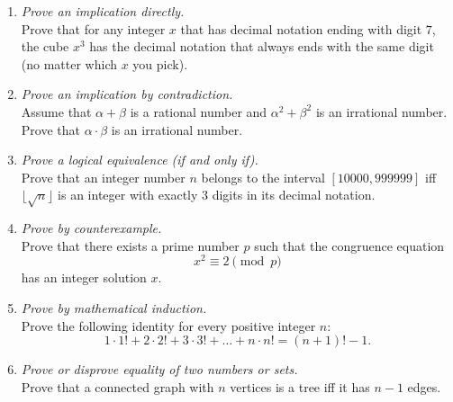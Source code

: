 \documentclass[a4paper,12pt]{article}
\begin{document}
\begin{enumerate}
\item {\small \em Prove an implication directly.}\\
Prove that for any integer $x$ that has decimal notation ending with digit $7$,
the cube $x^3$ has the decimal notation that always ends with the same digit
(no matter which $x$ you pick).


\item {\small \em Prove an implication by contradiction.}\\
Assume that $\alpha + \beta$ is a rational number and $\alpha^2 + \beta^2$ is
an irrational number. Prove that $\alpha \cdot \beta$ is an irrational number.


\item {\small \em  Prove a logical equivalence (if and only if).}\\
Prove that an integer number $n$ belongs to the interval $[10000,999999]$
iff $\lfloor \sqrt{n} \rfloor$ is an integer with exactly $3$ digits in
its decimal notation.


\item {\small \em Prove by counterexample.}\\
Prove that there exists a prime number $p$ such that the congruence equation
\[ x^2 \equiv 2 \pmod{p} \]
has an integer solution $x$.


\item {\small \em
Prove by mathematical induction.}\\
Prove the following identity for every positive integer $n$:
\[ 1 \cdot 1! + 2 \cdot 2! + 3 \cdot 3! + \ldots + n \cdot n! = (n+1)! - 1. \]




\item {\small \em Prove or disprove equality of two numbers or sets.}\\
Prove that a connected graph with $n$ vertices is a tree iff it has $n-1$ edges.
\end{enumerate}
\end{document}
